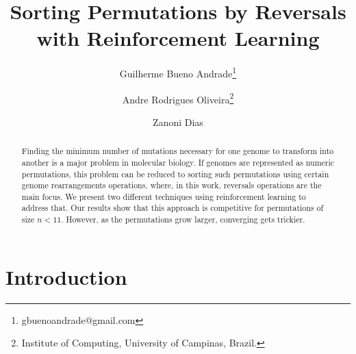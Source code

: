 \documentclass[11pt,twoside]{article}
\begin{document}


%



\TRMakeCover

\pagestyle{myheadings}

\title{Sorting Permutations by Reversals\\ with Reinforcement Learning}

\newcommand*\samethanks[1][\value{footnote}]{\footnotemark[#1]}
\author{Guilherme Bueno Andrade\thanks{gbuenoandrade@gmail.com} \and
Andre Rodrigues Oliveira\thanks{Institute of Computing, University of Campinas, Brazil.} \and Zanoni Dias\samethanks}

\date{}

\maketitle


\begin{abstract} 

Finding the minimum number of mutations necessary for one genome to transform into another is a major problem in molecular biology. If genomes are represented as numeric permutations, this problem can be reduced to sorting such permutations using certain genome rearrangements operations, where, in this work, reversals operations are the main focus. We present two different techniques using reinforcement learning to address that. Our results show that this approach is competitive for permutations of size $n < 11$. However, as the permutations grow larger, converging gets trickier.

\end{abstract}

\section{Introduction}
\end{document}
